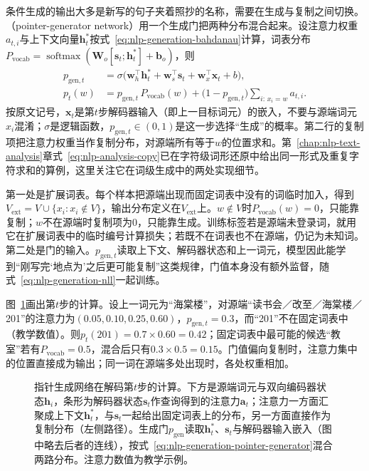 条件生成的输出大多是新写的句子夹着照抄的名称，需要在生成与复制之间切换。（pointer-generator network）用一个生成门把两种分布混合起来。设注意力权重$a_{t,i}$与上下文向量$\bm h^{*}_t$按式~\eqref{eq:nlp-generation-bahdanau}计算，词表分布$P_{\mathrm{vocab}}=\operatorname{softmax}(\bm W_o[\bm s_t;\bm h^{*}_t]+\bm b_o)$，则
\begin{equation}
  \begin{aligned}
    p_{\mathrm{gen},t}&=\sigma\bigl(\bm w_h^{\top}\bm h^{*}_t+\bm w_s^{\top}\bm s_t+\bm w_x^{\top}\bm x_t+b\bigr),\\
    p_t(w)&=p_{\mathrm{gen},t}\,P_{\mathrm{vocab}}(w)+\bigl(1-p_{\mathrm{gen},t}\bigr)\sum_{i:\,x_i=w}a_{t,i}.
  \end{aligned}
  \label{eq:nlp-generation-pointer-generator}
\end{equation}
按原文记号，$\bm x_t$是第$t$步解码器输入（即上一目标词元）的嵌入，不要与源端词元$x_i$混淆；$\sigma$是逻辑函数，$p_{\mathrm{gen},t}\in(0,1)$是这一步选择“生成”的概率。第二行的复制项把注意力权重当作复制分布，对源端所有等于$w$的位置求和。第~\ref{chap:nlp-text-analysis}章式~\eqref{eq:nlp-analysis-copy}已在字符级词形还原中给出同一形式及重复字符求和的算例，这里关注它在词级生成中的两处实现细节。

第一处是扩展词表。每个样本把源端出现而固定词表中没有的词临时加入，得到$V_{\mathrm{ext}}=V\cup\{x_i:x_i\notin V\}$，输出分布定义在$V_{\mathrm{ext}}$上。$w\notin V$时$P_{\mathrm{vocab}}(w)=0$，只能靠复制；$w$不在源端时复制项为$0$，只能靠生成。训练标签若是源端未登录词，就用它在扩展词表中的临时编号计算损失；若既不在词表也不在源端，仍记为未知词。第二处是门的输入。$p_{\mathrm{gen},t}$读取上下文、解码器状态和上一词元，模型因此能学到“刚写完‘地点为’之后更可能复制”这类规律，门值本身没有额外监督，随式~\eqref{eq:nlp-generation-nll}一起训练。

图~\ref{fig:nlp-generation-pointer-generator}画出第$t$步的计算。设上一词元为“海棠楼”，对源端“读书会／改至／海棠楼／201”的注意力为$(0.05,0.10,0.25,0.60)$，$p_{\mathrm{gen},t}=0.3$，而“201”不在固定词表中（教学数值）。则$p_t(\text{201})=0.7\times0.60=0.42$；固定词表中最可能的候选“教室”若有$P_{\mathrm{vocab}}=0.5$，混合后只有$0.3\times0.5=0.15$。门值偏向复制时，注意力集中的位置直接成为输出；同一词在源端多处出现时，各处权重相加。

\begin{figure}[htbp]
  \centering
  
  \caption{指针生成网络在解码第$t$步的计算。下方是源端词元与双向编码器状态$\bm h_i$，条形为解码器状态$\bm s_t$作查询得到的注意力$\bm a_t$；注意力一方面汇聚成上下文$\bm h^{*}_t$，与$\bm s_t$一起给出固定词表上的分布，另一方面直接作为复制分布（左侧路径）。生成门$p_{\mathrm{gen}}$读取$\bm h^{*}_t$、$\bm s_t$与解码器输入嵌入（图中略去后者的连线），按式~\eqref{eq:nlp-generation-pointer-generator}混合两路分布。注意力数值为教学示例。}
  \label{fig:nlp-generation-pointer-generator}
\end{figure}

